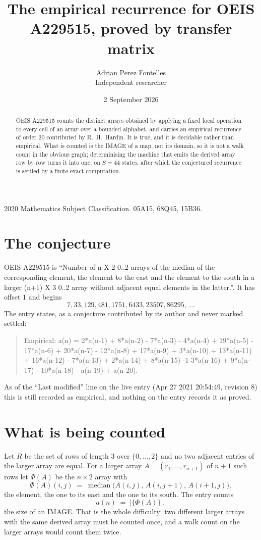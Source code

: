 \documentclass[11pt,a4paper]{article}
\title{The empirical recurrence for OEIS A229515, proved by transfer matrix}
\author{Adrian Perez Fontelles\\ \small Independent researcher}
\date{2 September 2026}
\theoremstyle{plain}
\theoremstyle{definition}
\begin{document}
\maketitle

\begin{abstract}
OEIS A229515 counts the distinct arrays obtained by applying a fixed local operation to every cell
of an array over a bounded alphabet, and carries an empirical recurrence of order $20$
contributed by R.~H.~Hardin. It is true, and it is decidable rather than empirical. What is
counted is the IMAGE of a map, not its domain, so it is not a walk count in the obvious graph;
determinising the machine that emits the derived array row by row turns it into one, on
$S=44$ states, after which the conjectured recurrence is settled by a finite exact
computation.
\end{abstract}

\noindent\small 2020 Mathematics Subject Classification. 05A15, 68Q45, 15B36.\normalsize

\section{The conjecture}

OEIS A229515 is ``Number of n X 2 0..2 arrays of the median of the corresponding element, the element to the east and the element to the south in a larger (n+1) X 3 0..2 array without adjacent equal elements in the latter.''. It has offset $1$ and begins
\[
7, 33, 129, 481, 1751, 6433, 23507, 86295,\ \dots
\]
The entry states, as a conjecture contributed by its author and never marked settled:
\begin{quote}
Empirical: a(n) = 2*a(n-1) + 8*a(n-2) - 7*a(n-3) - 4*a(n-4) + 19*a(n-5) - 17*a(n-6) + 20*a(n-7) - 12*a(n-8) + 17*a(n-9) + 3*a(n-10) + 13*a(n-11) + 16*a(n-12) - 7*a(n-13) + 2*a(n-14) + 8*a(n-15) -1 3*a(n-16) + 9*a(n-17) - 10*a(n-18) - a(n-19) + a(n-20).
\end{quote}
As of the ``Last modified'' line on the live entry (Apr 27 2021 20:54:49, revision 8) this is still
recorded as empirical, and nothing on the entry records it as proved.

\section{What is being counted}

Let $R$ be the set of rows of length $3$ over $\{0,\dots,2\}$ and no two adjacent entries of the larger array are equal.
For a larger array $A=(r_1,\dots,r_{n+1})$ of $n+1$ such rows let $\Phi(A)$ be the
$n\times2$ array with
\[
\Phi(A)(i,j)\;=\;\operatorname{median}\bigl(A(i,j),\,A(i,j+1),\,A(i+1,j)\bigr),
\]
the element, the one to its east and the one to its south. The entry counts
\[
a(n)\;=\;\bigl|\{\Phi(A)\}\bigr| ,
\]
the size of an IMAGE. That is the whole difficulty: two different larger arrays with the same
derived array must be counted once, and a walk count on the larger arrays would count them
twice.
\end{document}
